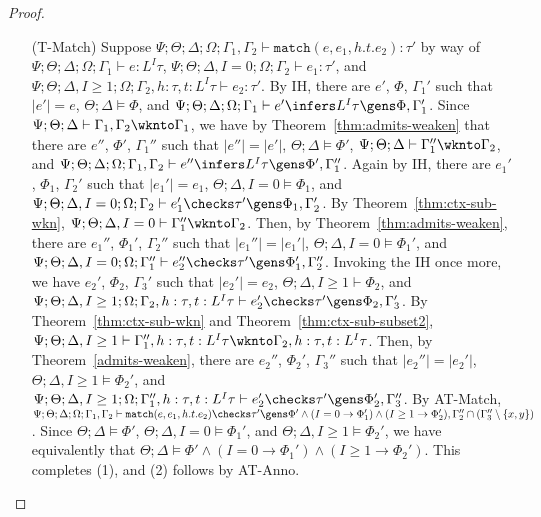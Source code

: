 \begin{proof}
\begin{itemize}
  
  \item[(T-Match)] Suppose
  $\Psi ; \Theta ; \Delta ; \Omega ; \Gamma_1,\Gamma_2\vdash \texttt{match}(e,e_1,h.t.e_2) : \tau'$ by way of
  $\Psi ; \Theta ; \Delta ; \Omega ; \Gamma_1\vdash e : L^I \tau$,
  $\Psi ; \Theta ; \Delta, I = 0 ; \Omega ; \Gamma_2\vdash e_1 : \tau'$, and
  $\Psi ; \Theta ; \Delta, I \geq 1; \Omega ; \Gamma_2, h : \tau, t : L^I \tau \vdash e_2 : \tau'$.
  By IH, there are $e'$, $\Phi$, $\Gamma_1'$ such that
  $|e'| = e$,
  $\Theta ; \Delta \vDash \Phi$, and
  $\Psi ; \Theta ; \Delta ; \Omega ; \Gamma_1 \vdash e' \infers L^I \tau \gens \Phi, \Gamma_1'$.
  Since $\Psi ; \Theta ; \Delta \vdash \Gamma_1,\Gamma_2 \wknto \Gamma_1$,
  we have by Theorem~\ref{thm:admits-weaken} that there are $e''$, $\Phi'$, $\Gamma_1''$ such that
  $|e''| = |e'|$,
  $\Theta ; \Delta \vDash \Phi'$,
  $\Psi ; \Theta ; \Delta \vdash \Gamma_1'' \wknto \Gamma_2$, and
  $\Psi ; \Theta ; \Delta ; \Omega ; \Gamma_1,\Gamma_2 \vdash e'' \infers L^I \tau \gens \Phi', \Gamma_1''$.
  Again by IH, there are $e_1'$, $\Phi_1$, $\Gamma_2'$ such that
  $|e_1'| = e_1$,
  $\Theta ; \Delta, I = 0 \vDash \Phi_1$, and
  $\Psi ; \Theta ; \Delta, I = 0 ; \Omega ; \Gamma_2 \vdash e_1' \checks \tau' \gens \Phi_1,\Gamma_2'$.
  By Theorem~\ref{thm:ctx-sub-wkn},
  $\Psi ; \Theta ; \Delta, I = 0 \vdash \Gamma_1'' \wknto \Gamma_2$.
  Then, by Theorem~\ref{thm:admits-weaken}, there are $e_1''$, $\Phi_1'$, $\Gamma_2''$ such that
  $|e_1''| = |e_1'|$,
  $\Theta ; \Delta, I = 0 \vDash \Phi_1'$, and
  $\Psi ; \Theta ; \Delta, I = 0 ; \Omega ; \Gamma_1'' \vdash e_2'' \checks \tau' \gens \Phi_1',\Gamma_2''$.
  Invoking the IH once more, we have $e_2'$, $\Phi_2$, $\Gamma_3'$ such that
  $|e_2'| = e_2$,
  $\Theta ; \Delta, I \geq 1 \vdash \Phi_2$, and
  $\Psi ; \Theta ; \Delta, I \geq 1 ; \Omega ; \Gamma_2, h : \tau, t : L^I \tau \vdash e_2' \checks \tau' \gens \Phi_2,\Gamma_3'$.
  By Theorem~\ref{thm:ctx-sub-wkn} and Theorem~\ref{thm:ctx-sub-subset2},
  $\Psi ; \Theta ; \Delta, I \geq 1 \vdash \Gamma_1'', h : \tau, t : L^I \tau \wknto \Gamma_2, h : \tau, t : L^I \tau$.
  Then, by Theorem~\ref{admits-weaken}, there are $e_2''$, $\Phi_2'$, $\Gamma_3''$ such that
  $|e_2''| = |e_2'|$,
  $\Theta ; \Delta, I \geq 1 \vDash \Phi_2'$, and
  $\Psi ; \Theta ; \Delta, I \geq 1; \Omega ; \Gamma_1'', h : \tau, t : L^I \tau \vdash e_2' \checks \tau' \gens \Phi_2',\Gamma_3''$.
  By AT-Match,
  $\Psi ; \Theta ; \Delta ; \Omega ; \Gamma_1,\Gamma_2\vdash \texttt{match}(e,e_1,h.t.e_2) \checks \tau' \gens \Phi' \wedge (I = 0 \to \Phi_1') \wedge (I \geq 1 \to \Phi_2'), \Gamma_2'' \cap (\Gamma_3'' \setminus \{x,y\})$.
  Since $\Theta ; \Delta \vDash \Phi'$,  $\Theta ; \Delta, I = 0 \vDash \Phi_1'$, and $\Theta ; \Delta, I \geq 1 \vDash \Phi_2'$, we have equivalently that
  $\Theta ; \Delta \vDash \Phi' \wedge (I = 0 \to \Phi_1') \wedge (I \geq 1 \to \Phi_2')$. This completes (1), and (2) follows by AT-Anno.
  

\end{itemize}
\end{proof}

